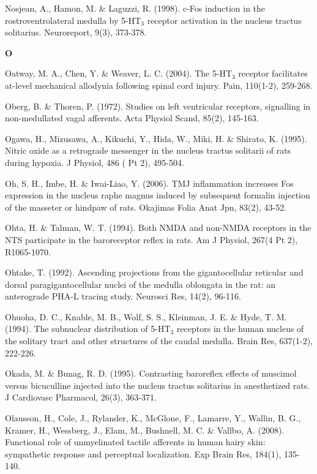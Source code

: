 \documentclass[a4paper,12pt,twoside]{report}
\begin{document}
\begin{singlespacing}
\begin{footnotesize}
Nosjean, A., Hamon, M. \& Laguzzi, R. (1998). c-Fos induction in the rostroventrolateral medulla by 5-HT$_{3}$ receptor activation in the nucleus tractus solitarius. Neuroreport, 9(3), 373-378.

\medskip
\begin{Large}\textbf{O}\end{Large}

Oatway, M. A., Chen, Y. \& Weaver, L. C. (2004). The 5-HT$_{3}$ receptor facilitates at-level mechanical allodynia following spinal cord injury. Pain, 110(1-2), 259-268.

Oberg, B. \& Thoren, P. (1972). Studies on left ventricular receptors, signalling in non-medullated vagal afferents. Acta Physiol Scand, 85(2), 145-163.

Ogawa, H., Mizusawa, A., Kikuchi, Y., Hida, W., Miki, H. \& Shirato, K. (1995). Nitric oxide as a retrograde messenger in the nucleus tractus solitarii of rats during hypoxia. J Physiol, 486 ( Pt 2), 495-504.

Oh, S. H., Imbe, H. \& Iwai-Liao, Y. (2006). TMJ inflammation increases Fos expression in the nucleus raphe magnus induced by subsequent formalin injection of the masseter or hindpaw of rats. Okajimas Folia Anat Jpn, 83(2), 43-52.

Ohta, H. \& Talman, W. T. (1994). Both NMDA and non-NMDA receptors in the NTS participate in the baroreceptor reflex in rats. Am J Physiol, 267(4 Pt 2), R1065-1070.

Ohtake, T. (1992). Ascending projections from the gigantocellular reticular and dorsal paragigantocellular nuclei of the medulla oblongata in the rat: an anterograde PHA-L tracing study. Neurosci Res, 14(2), 96-116.

Ohuoha, D. C., Knable, M. B., Wolf, S. S., Kleinman, J. E. \& Hyde, T. M. (1994). The subnuclear distribution of 5-HT$_{3}$ receptors in the human nucleus of the solitary tract and other structures of the caudal medulla. Brain Res, 637(1-2), 222-226.

Okada, M. \& Bunag, R. D. (1995). Contrasting baroreflex effects of muscimol versus bicuculline injected into the nucleus tractus solitarius in anesthetized rats. J Cardiovasc Pharmacol, 26(3), 363-371.

Olausson, H., Cole, J., Rylander, K., McGlone, F., Lamarre, Y., Wallin, B. G., Kramer, H., Wessberg, J., Elam, M., Bushnell, M. C. \& Vallbo, A. (2008). Functional role of unmyelinated tactile afferents in human hairy skin: sympathetic response and perceptual localization. Exp Brain Res, 184(1), 135-140.


\end{footnotesize}
\end{singlespacing}
\end{document}
